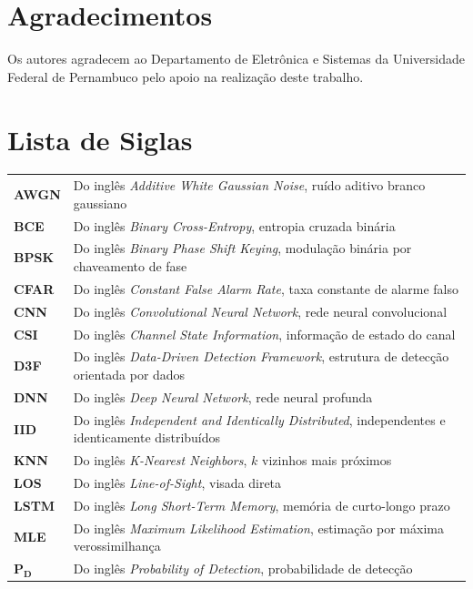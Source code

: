 \documentclass{sbrt}
\begin{document}
\section*{Agradecimentos}
Os autores agradecem ao Departamento de Eletrônica e Sistemas da Universidade Federal de Pernambuco pelo apoio na realização deste trabalho.

\section*{Lista de Siglas}
{\small
\begin{tabular}{@{}p{1.9cm}p{5.9cm}@{}}
\textbf{AWGN}      & Do inglês \textit{Additive White Gaussian Noise}, ruído aditivo branco gaussiano \\
\textbf{BCE}       & Do inglês \textit{Binary Cross-Entropy}, entropia cruzada binária \\
\textbf{BPSK}      & Do inglês \textit{Binary Phase Shift Keying}, modulação binária por chaveamento de fase \\
\textbf{CFAR}      & Do inglês \textit{Constant False Alarm Rate}, taxa constante de alarme falso \\
\textbf{CNN}       & Do inglês \textit{Convolutional Neural Network}, rede neural convolucional \\
\textbf{CSI}       & Do inglês \textit{Channel State Information}, informação de estado do canal \\
\textbf{D3F}       & Do inglês \textit{Data-Driven Detection Framework}, estrutura de detecção orientada por dados \\
\textbf{DNN}       & Do inglês \textit{Deep Neural Network}, rede neural profunda \\
\textbf{IID}       & Do inglês \textit{Independent and Identically Distributed}, independentes e identicamente distribuídos \\
\textbf{KNN}       & Do inglês \textit{K-Nearest Neighbors}, $k$ vizinhos mais próximos \\
\textbf{LOS}       & Do inglês \textit{Line-of-Sight}, visada direta \\
\textbf{LSTM}      & Do inglês \textit{Long Short-Term Memory}, memória de curto-longo prazo \\
\textbf{MLE}       & Do inglês \textit{Maximum Likelihood Estimation}, estimação por máxima verossimilhança \\
$\boldsymbol{P_D}$ & Do inglês \textit{Probability of Detection}, probabilidade de detecção \\

\end{tabular}}
\end{document}
